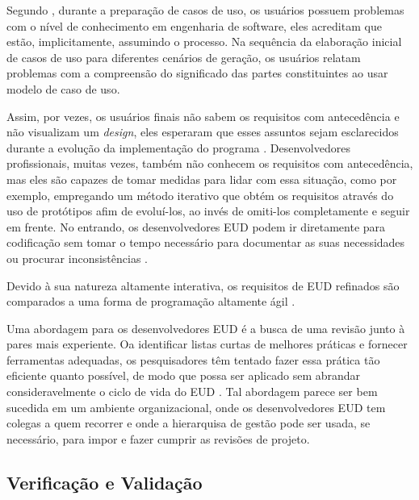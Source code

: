 Segundo , durante a preparação de casos de uso, os usuários possuem problemas com o nível de conhecimento em engenharia de software, eles acreditam que estão, implicitamente, assumindo o processo. Na sequência da elaboração inicial de casos de uso para diferentes cenários de geração, os usuários relatam problemas com a compreensão do significado das partes constituintes ao usar modelo de caso de uso.

Assim, por vezes, os usuários finais não sabem os requisitos com antecedência e não visualizam um \textit{design}, eles esperaram que esses assuntos sejam esclarecidos durante a evolução da implementação do programa \cite{costabile2006supporting,fischer2006meta,morch2000tailoring}. Desenvolvedores profissionais, muitas vezes, também não conhecem os requisitos com antecedência, mas eles são capazes de tomar medidas para lidar com essa situação, como por exemplo, empregando um método iterativo que obtém os requisitos através do uso de protótipos afim de evoluí-los, ao invés de omiti-los completamente e seguir em frente. No entrando, os desenvolvedores EUD podem ir diretamente para codificação sem tomar o tempo necessário para documentar as suas necessidades ou procurar inconsistências \cite{rosson2013end}.

Devido à sua natureza altamente interativa, os requisitos de EUD refinados são comparados a uma forma de programação altamente ágil \cite{lieberman2006}.

Uma abordagem para os desenvolvedores EUD é a busca de uma revisão junto à pares mais experiente. Oa identificar listas curtas de melhores práticas e fornecer ferramentas adequadas, os pesquisadores têm tentado fazer essa prática tão eficiente quanto possível, de modo que possa ser aplicado sem abrandar consideravelmente o ciclo de vida do EUD \cite{powell2008management,rosson2013end}. Tal abordagem parece ser bem sucedida em um ambiente organizacional, onde os desenvolvedores EUD tem colegas a quem recorrer e onde a hierarquisa de gestão pode ser usada, se necessário, para impor e fazer cumprir as revisões de projeto.

\subsection{Verificação e Validação}

